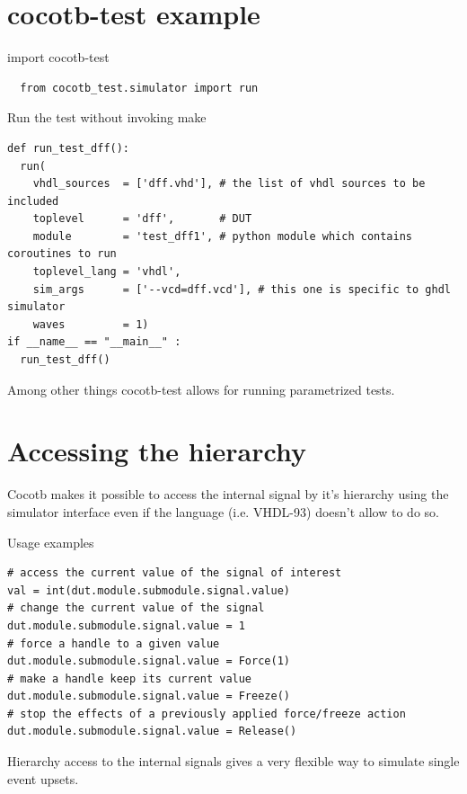 \documentclass[aspectratio=169]{beamer}
\begin{document}
\section*{cocotb-test example}
\begin{frame}[fragile]{\secname}
    \begin{block}{import cocotb-test}
    \begin{verbatim}
  from cocotb_test.simulator import run
    \end{verbatim}
\end{block}


\begin{block}{Run the test without invoking make}
  \begin{verbatim}
def run_test_dff():
  run(
    vhdl_sources  = ['dff.vhd'], # the list of vhdl sources to be included
    toplevel      = 'dff',       # DUT
    module        = 'test_dff1', # python module which contains coroutines to run
    toplevel_lang = 'vhdl',
    sim_args      = ['--vcd=dff.vcd'], # this one is specific to ghdl simulator 
    waves         = 1)
if __name__ == "__main__" :
  run_test_dff()

  \end{verbatim}
\end{block}
  Among other things cocotb-test allows for running parametrized tests.
\end{frame}


\section*{Accessing the hierarchy}
\begin{frame}[fragile]{\secname}
  Cocotb makes it possible to access the internal signal by it's hierarchy using the simulator interface 
  even if the language (i.e. VHDL-93) doesn't allow to do so.
  \begin{block}{Usage examples}
  \begin{verbatim}
# access the current value of the signal of interest
val = int(dut.module.submodule.signal.value)
# change the current value of the signal
dut.module.submodule.signal.value = 1
# force a handle to a given value 
dut.module.submodule.signal.value = Force(1)  
# make a handle keep its current value
dut.module.submodule.signal.value = Freeze() 
# stop the effects of a previously applied force/freeze action
dut.module.submodule.signal.value = Release() 
  \end{verbatim}
  \end{block}
Hierarchy access to the internal signals gives a very flexible way to simulate single event upsets.
    
\end{frame}
\end{document}
